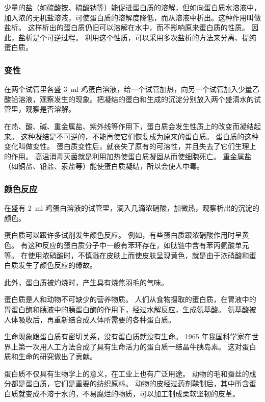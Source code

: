 少量的盐（如硫酸铵、硫酸钠等）能促进蛋白质的溶解，但如向蛋白质水溶液中，加入浓的无机盐溶液，可使蛋白质的溶解度降低，而从溶液中析出。这种作用叫做盐析。
这样析出的蛋白质仍旧可以溶解在水中，而不影响原来蛋白质的性质。
因此，盐析是个可逆过程。
利用这个性质，可以采用多次盐析的方法来分离、提纯蛋白质。

\subsubsection{变性}
\begin{Experiment}
在两个试管里各盛 \qty{3}{ml} 鸡蛋白溶液，给一个试管加热，向另一个试管加入少量乙酸铅溶液，观察发生的现象。把凝结的蛋白和生成的沉淀分别放入两个盛清水的试管里，观察是否溶解。 
\end{Experiment}

在热、酸、碱、重金属盐、紫外线等作用下，蛋白质会发生性质上的改变而凝结起来。
这种凝结是不可逆的，不能再使它们恢复成为原来的蛋白质。
蛋白质的这种变化叫做变性。
蛋白质变性后，就丧失了原有的可溶性，并且失去了它们生理上的作用。
高温消毒灭菌就是利用加热使蛋白质凝固从而使细胞死亡。
重金属盐（如铜盐、铅盐、汞盐等）能使蛋白质凝结，所以会使人中毒。

\subsubsection{颜色反应}
\begin{Experiment}
在盛有 \qty{2}{ml} 鸡蛋白溶液的试管里，滴入几滴浓硝酸，加微热，观察析出的沉淀的颜色。
\end{Experiment}

蛋白质可以跟许多试剂发生颜色反应。
例如，有些蛋白质跟浓硝酸作用时呈黄色。
有这种反应的蛋白质分子中一般有苯环存在，如肽链中含有苯丙氨酸单元等。
在使用浓硝酸时，不慎溅在皮肤上而使皮肤呈现黄色，就是由于浓硝酸和蛋白质发生了颜色反应的缘故。

此外，蛋白质被灼烧时，产生具有烧焦羽毛的气味。

蛋白质是人和动物不可缺少的营养物质。
人们从食物摄取的蛋白质，在胃液中的胃蛋白酶和胰液中的胰蛋白酶的作用下，经过水解反应，生成氨基酸。
氨基酸被人体吸收后，再重新结合成人体所需要的各种蛋白质。

生命现象跟蛋白质有密切关系，没有蛋白质就没有生命。
1965 年我国科学家在世界上第一次用人工方法合成了具有生命活力的蛋白质一结晶牛胰岛素。
这对蛋白质和生命的研究做出了贡献。

蛋白质不仅具有生物学上的意义，在工业上也有广泛用途。
动物的毛和蚕丝的成分都是蛋白质，它们是重要的纺织原料。
动物的皮经过药剂鞣制后，其中所含蛋白质就变成不溶于水的，不易腐烂的物质，可以加工制成柔软坚韧的皮革。


